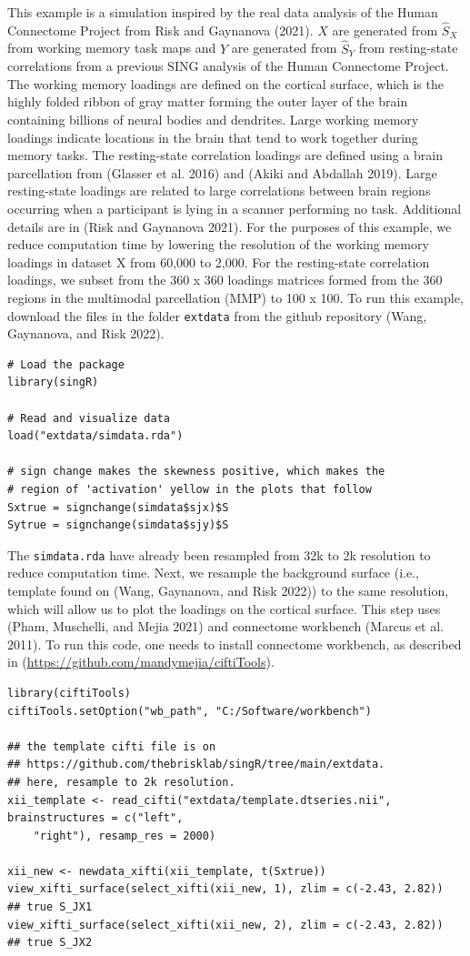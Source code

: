 This example is a simulation inspired by the real data analysis of the Human Connectome Project from Risk and Gaynanova (2021). \(X\) are generated from \(\widehat{S}_X\) from working memory task maps and \(Y\) are generated from \(\widehat{S}_Y\) from resting-state correlations from a previous SING analysis of the Human Connectome Project. The working memory loadings are defined on the cortical surface, which is the highly folded ribbon of gray matter forming the outer layer of the brain containing billions of neural bodies and dendrites. Large working memory loadings indicate locations in the brain that tend to work together during memory tasks. The resting-state correlation loadings are defined using a brain parcellation from (Glasser et al. 2016) and (Akiki and Abdallah 2019). Large resting-state loadings are related to large correlations between brain regions occurring when a participant is lying in a scanner performing no task. Additional details are in (Risk and Gaynanova 2021). For the purposes of this example, we reduce computation time by lowering the resolution of the working memory loadings in dataset X from 60,000 to 2,000. For the resting-state correlation loadings, we subset from the 360 x 360 loadings matrices formed from the 360 regions in the multimodal parcellation (MMP) to 100 x 100. To run this example, download the files in the folder \texttt{extdata} from the github repository (Wang, Gaynanova, and Risk 2022).

\begin{verbatim}
# Load the package
library(singR)

# Read and visualize data
load("extdata/simdata.rda")

# sign change makes the skewness positive, which makes the
# region of 'activation' yellow in the plots that follow
Sxtrue = signchange(simdata$sjx)$S
Sytrue = signchange(simdata$sjy)$S
\end{verbatim}

The \texttt{simdata.rda} have already been resampled from 32k to 2k resolution to reduce computation time. Next, we resample the background surface (i.e., template found on (Wang, Gaynanova, and Risk 2022)) to the same resolution, which will allow us to plot the loadings on the cortical surface. This step uses  (Pham, Muschelli, and Mejia 2021) and connectome workbench (Marcus et al. 2011). To run this code, one needs to install connectome workbench, as described in (\url{https://github.com/mandymejia/ciftiTools}).

\begin{verbatim}
library(ciftiTools)
ciftiTools.setOption("wb_path", "C:/Software/workbench")

## the template cifti file is on
## https://github.com/thebrisklab/singR/tree/main/extdata.
## here, resample to 2k resolution.
xii_template <- read_cifti("extdata/template.dtseries.nii", brainstructures = c("left",
    "right"), resamp_res = 2000)

xii_new <- newdata_xifti(xii_template, t(Sxtrue))
view_xifti_surface(select_xifti(xii_new, 1), zlim = c(-2.43, 2.82))  ## true S_JX1
view_xifti_surface(select_xifti(xii_new, 2), zlim = c(-2.43, 2.82))  ## true S_JX2
\end{verbatim}

